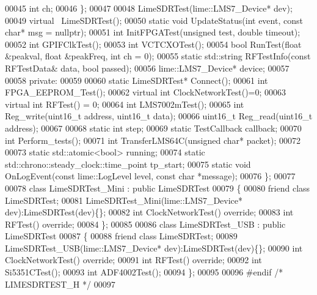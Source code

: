 \begin{DoxyCode}
00045         \textcolor{keywordtype}{int} ch;
00046     \};
00047     
00048     LimeSDRTest(lime::LMS7_Device* dev);
00049     \textcolor{keyword}{virtual} ~LimeSDRTest();
00050     \textcolor{keyword}{static} \textcolor{keywordtype}{void} UpdateStatus(\textcolor{keywordtype}{int} event, \textcolor{keyword}{const} \textcolor{keywordtype}{char}* msg = \textcolor{keyword}{nullptr});
00051     \textcolor{keywordtype}{int} InitFPGATest(\textcolor{keywordtype}{unsigned} test, \textcolor{keywordtype}{double} timeout);
00052     \textcolor{keywordtype}{int} GPIFClkTest();
00053     \textcolor{keywordtype}{int} VCTCXOTest();
00054     \textcolor{keywordtype}{bool} RunTest(\textcolor{keywordtype}{float} &peakval, \textcolor{keywordtype}{float} &peakFreq, \textcolor{keywordtype}{int} ch = 0);
00055     \textcolor{keyword}{static} std::string RFTestInfo(\textcolor{keyword}{const} RFTestData& data, \textcolor{keywordtype}{bool} passed); 
00056     lime::LMS7_Device* device;
00057     
00058 \textcolor{keyword}{private}:
00059     
00060     \textcolor{keyword}{static} LimeSDRTest* Connect();
00061     \textcolor{keywordtype}{int} FPGA_EEPROM_Test();
00062     \textcolor{keyword}{virtual} \textcolor{keywordtype}{int} ClockNetworkTest()=0;
00063     \textcolor{keyword}{virtual} \textcolor{keywordtype}{int} RFTest() = 0;
00064     \textcolor{keywordtype}{int} LMS7002mTest();
00065     \textcolor{keywordtype}{int} Reg_write(uint16\_t address, uint16\_t data);
00066     uint16\_t Reg_read(uint16\_t address);
00067 
00068     \textcolor{keyword}{static} \textcolor{keywordtype}{int} step;
00069     \textcolor{keyword}{static} TestCallback callback;
00070     \textcolor{keywordtype}{int} Perform_tests();
00071     \textcolor{keywordtype}{int} TransferLMS64C(\textcolor{keywordtype}{unsigned} \textcolor{keywordtype}{char}* packet);
00072 
00073     \textcolor{keyword}{static} std::atomic<bool> running;
00074     \textcolor{keyword}{static} std::chrono::steady\_clock::time\_point tp_start;
00075     \textcolor{keyword}{static} \textcolor{keywordtype}{void} OnLogEvent(\textcolor{keyword}{const} lime::LogLevel level, \textcolor{keyword}{const} \textcolor{keywordtype}{char} *message);
00076 \};
00077 
00078 \textcolor{keyword}{class }LimeSDRTest_Mini : \textcolor{keyword}{public} LimeSDRTest
00079 \{
00080     \textcolor{keyword}{friend} \textcolor{keyword}{class }LimeSDRTest;
00081     LimeSDRTest_Mini(lime::LMS7_Device* dev):LimeSDRTest(dev)\{\};
00082     \textcolor{keywordtype}{int} ClockNetworkTest() \textcolor{keyword}{override};
00083     \textcolor{keywordtype}{int} RFTest() \textcolor{keyword}{override};
00084 \};
00085 
00086 \textcolor{keyword}{class }LimeSDRTest_USB : \textcolor{keyword}{public} LimeSDRTest
00087 \{
00088     \textcolor{keyword}{friend} \textcolor{keyword}{class }LimeSDRTest;
00089     LimeSDRTest_USB(lime::LMS7_Device* dev):LimeSDRTest(dev)\{\};
00090     \textcolor{keywordtype}{int} ClockNetworkTest() \textcolor{keyword}{override};
00091     \textcolor{keywordtype}{int} RFTest() \textcolor{keyword}{override};
00092     \textcolor{keywordtype}{int} Si5351CTest();
00093     \textcolor{keywordtype}{int} ADF4002Test();
00094 \};
00095 
00096 \textcolor{preprocessor}{#endif }\textcolor{comment}{/* LIMESDRTEST\_H */}\textcolor{preprocessor}{}
00097 
\end{DoxyCode}
